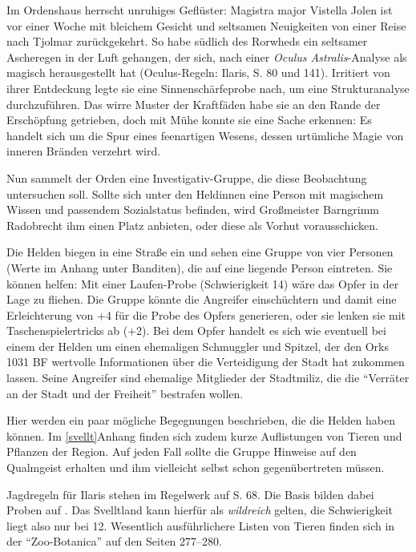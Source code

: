 Im Ordenshaus herrscht unruhiges Geflüster: Magistra major Vistella Jolen ist vor einer Woche mit bleichem Gesicht und seltsamen Neuigkeiten von einer Reise nach Tjolmar zurückgekehrt. So habe südlich des Rorwheds ein seltsamer Ascheregen in der Luft gehangen, der sich, nach einer \emph{Oculus Astralis}-Analyse als magisch herausgestellt hat (Oculus-Regeln: Ilaris, S. 80 und 141).
Irritiert von ihrer Entdeckung legte sie eine Sinnenschärfeprobe nach, um eine Strukturanalyse durchzuführen. Das wirre Muster der Kraftfäden habe sie an den Rande der Erschöpfung getrieben, doch mit Mühe konnte sie eine Sache erkennen: Es handelt sich um die Spur eines feenartigen Wesens, dessen urtümliche Magie von inneren Bränden verzehrt wird.

Nun sammelt der Orden eine Investigativ-Gruppe, die diese Beobachtung untersuchen soll. Sollte sich unter den Heldinnen eine Person mit magischem Wissen und passendem Sozialstatus befinden, wird Großmeister Barngrimm Radobrecht ihm einen Platz anbieten, oder diese als Vorhut vorausschicken.


Die Helden biegen in eine Straße ein und sehen eine Gruppe von vier Personen (Werte im Anhang unter Banditen), die auf eine liegende Person eintreten.
Sie können helfen: Mit einer Laufen-Probe (Schwierigkeit 14) wäre das Opfer in der Lage zu fliehen. Die Gruppe könnte die Angreifer einschüchtern und damit eine Erleichterung von +4 für die Probe des Opfers generieren, oder sie lenken sie mit Taschenspielertricks ab (+2).
Bei dem Opfer handelt es sich wie eventuell bei einem der Helden um einen ehemaligen Schmuggler und Spitzel, der den Orks 1031 BF wertvolle Informationen über die Verteidigung der Stadt hat zukommen lassen. Seine Angreifer sind ehemalige Mitglieder der Stadtmiliz, die die \enquote{Verräter an der Stadt und der Freiheit} bestrafen wollen.

\newpage

Hier werden ein paar mögliche Begegnungen beschrieben, die die Helden haben können. Im \ref{svellt}{Anhang} finden sich zudem kurze Auflistungen von Tieren und Pflanzen der Region. Auf jeden Fall sollte die Gruppe Hinweise auf den Qualmgeist erhalten und ihm vielleicht selbst schon gegenübertreten müssen.

Jagdregeln für Ilaris stehen im Regelwerk auf S. 68. Die Basis bilden dabei Proben auf .
Das Svelltland kann hierfür als \emph{wildreich} gelten, die Schwierigkeit liegt also nur bei 12.
Wesentlich ausführlichere Listen von Tieren finden sich in der \enquote{Zoo-Botanica} auf den Seiten 277--280.

